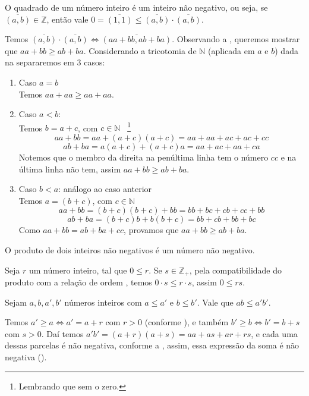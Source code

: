 \documentclass[../main.tex]{subfiles}
\begin{document}
\begin{prop}\label{int-prop-quadradoPositivo}
    O quadrado de um número inteiro é um inteiro não negativo, ou seja, se $\overline{(a,b)} \in \mathbb{Z}$, então vale $0 = \overline{(1,1)} \leq \overline{(a,b)} \cdot \overline{(a,b)}$. 
\end{prop}
\begin{dem}
    Temos $\overline{(a,b)} \cdot \overline{(a,b)} \iff \overline{(aa + bb, ab+ba)}$. Observando a , queremos mostrar que $aa+bb \geq ab+ba$. Considerando a tricotomia de $\mathbb{N}$ (aplicada em $a$ e $b$) dada na  separaremos em 3 casos:
    \begin{enumerate}[label=(\roman*)]
        \item Caso $a=b$ \\
        Temos $aa+aa \geq aa+aa$.

        \item Caso $a < b$: \\
        Temos $b = a+c$, com $c \in \mathbb{N}$ \ \footnote{Lembrando que sem o zero.} \\
        \[ aa+bb = aa+(a+c)(a+c) = aa+aa+ac+ac+cc \] 
        \[ ab+ba = a(a+c)+(a+c)a = aa+ac+aa+ca \]
        Notemos que o membro da direita na penúltima linha tem o número $cc$ e na última linha não tem, assim $aa+bb \geq ab+ba$.

        \item Caso $b < a$: análogo ao caso anterior\\
        Temos $a = (b+c)$, com $c \in \mathbb{N}$
        \[ aa+bb = (b+c)(b+c) + bb = bb+bc+cb+cc+bb \]
        \[ ab+ba = (b+c)b+b(b+c) = bb+cb+bb+bc \]
        Como $aa+bb = ab+ba+cc$, provamos que $aa+bb \geq ab+ba$.
    \end{enumerate}
\end{dem}

\begin{prop}\label{int-prop-produtoPositivo}
    O produto de dois inteiros não negativos é um número não negativo.
\end{prop}
\begin{dem}
    Seja $r$ um número inteiro, tal que $0 \leq r$. Se $s \in \mathbb{Z}_{+}$, pela compatibilidade do produto com a relação de ordem , temos $0 \cdot s \leq r \cdot s$, assim $0 \leq rs$.
\end{dem}
\begin{prop}
    Sejam $a, b, a', b'$ números inteiros com $a \leq a'$ e $b \leq b'$. Vale que $ab \leq a'b'$.
\end{prop}
\begin{dem}
    Temos $a' \geq a \iff a' = a + r$ com $r > 0$ (conforme ), e também $b' \geq b \iff b' = b+s$ com $s > 0$.
    Daí temos $a'b' = (a+r)(a+s) = aa+as+ar+rs$, e cada uma dessas parcelas é não negativa, conforme a , assim, essa expressão da soma é não negativa ().
    
\end{dem}
\end{document}
